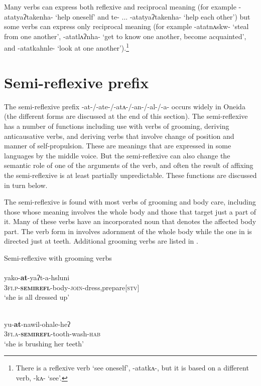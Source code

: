 \documentclass[output=paper]{langscibook}
\begin{document}
Many verbs can express both reflexive and reciprocal meaning (for example -{atatyaʔtakenha-} ‘help oneself’ and {te-} ... {-atatyaʔtakenha-} ‘help each other’) but some verbs can express only reciprocal meaning (for example {-atatnʌskw-} ‘steal from one another’, {{}-atatlʌʔnha-} ‘get to know one another, become acquainted’, and {-atatkahnle-} ‘look at one another’).\footnote{There is a reflexive verb ‘see one\-self’, {{}-atatkʌ-}, but it is based on a different verb, {{}-kʌ-} ‘see’.}

\section{Semi-reflexive prefix}\label{sec:oneida:4}

The semi-reflexive prefix {-at-/-ate-/-atʌ-/-an-/-al-/-a-} occurs widely in Oneida (the different forms are discussed at the end of this section). The semi-reflexive has a number of functions including use with verbs of grooming, deriving anticausative verbs, and deriving verbs that involve change of position and manner of self-propulsion. These are meanings that are expressed  in some languages by the middle voice. But the semi-reflexive can also change the semantic role of one of the arguments of the verb, and often the result of affixing the semi-reflexive is at least partially unpredictable. These functions are discussed in turn below.

The semi-reflexive is found with most verbs of grooming and body care, including those whose meaning involves the whole body and those that target just a part of it. Many of these verbs have an incorporated noun that denotes the affected body part. The verb form in  involves adornment of the whole body while the one in  is directed just at teeth. Additional grooming verbs are listed in .
      

\ea%
\label{ex:oneida:17}
 Semi-reflexive with grooming verbs\\
    \ea \label{ex:oneida:17a}
     \\
     yako-\textbf{at}{}-yaʔt-a-hsluni\\
        \textsc{3fi.p}{}-\textbf{\textsc{semirefl}}{}-body-\textsc{join}{}-dress,prepare[\textsc{stv}]\\
  \glt ‘she is all dressed up’ 
    
    \ex 
     \label{ex:oneida:17b} 
     \\
    yu-\textbf{at}{}-nawil-ohale-heʔ\\
    \textsc{3fi.a}{}-\textbf{\textsc{semirefl}}{}-tooth-wash-\textsc{hab}\\
  \glt ‘she is brushing her teeth’
    
\end{document}
